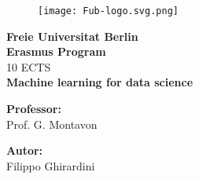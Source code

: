 \begin{titlepage} %
\begin{figure}[t] %
    \centering\texttt{[image: Fub-logo.svg.png]}
\end{figure}
\vspace{20mm}

\begin{Large}
 \begin{center}
	\textbf{Freie Universitat Berlin\\ Erasmus Program\\}
	\vspace{20mm}
    {\LARGE{10 ECTS}}\\
	\vspace{10mm}
	{\huge{\bf Machine learning for data science}}\\
\end{center}
\end{Large}


\vspace{36mm}
\begin{minipage}[t]{0.47\textwidth}
	{\large{\bf Professor:}\\ \large{Prof. G. Montavon}}
\end{minipage}
\hfill
\begin{minipage}[t]{0.47\textwidth}\raggedleft
	{\large{\bf Autor:}\\ \large{Filippo Ghirardini}}
\end{minipage}

\vspace{25mm}

\hrulefill

\vspace{5mm}


\end{titlepage}